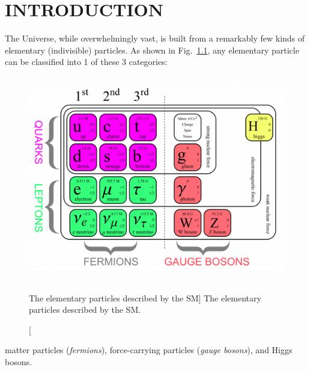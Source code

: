 \chapter{INTRODUCTION}
\label{ch:intro}
The Universe, while overwhelmingly vast, is built from a remarkably few kinds of elementary
(\ie indivisible) particles.
As shown in Fig.~\ref{fig:particular_table}, any elementary particle can be classified into 1 of these 3 categories:
\begin{figure}[!b]
    \centering
    \includegraphics[height=9cm,keepaspectratio]{figures/sm/particular_table_updated.png}
        \caption
            [The elementary particles described by the SM]
            {The elementary particles described by the SM.}
        \label{fig:particular_table}
\end{figure}
matter particles (\emph{fermions}), force-carrying particles (\emph{gauge bosons}), and Higgs bosons.
